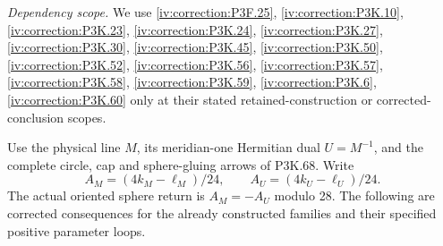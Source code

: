 \begin{theorem}\hypertarget{tag-02VG}{}\label{night:P3K.69}

\par\noindent\textit{Dependency scope.} We use \cref{iv:correction:P3F.25}, \cref{iv:correction:P3K.10}, \cref{iv:correction:P3K.23}, \cref{iv:correction:P3K.24}, \cref{iv:correction:P3K.27}, \cref{iv:correction:P3K.30}, \cref{iv:correction:P3K.45}, \cref{iv:correction:P3K.50}, \cref{iv:correction:P3K.52}, \cref{iv:correction:P3K.56}, \cref{iv:correction:P3K.57}, \cref{iv:correction:P3K.58}, \cref{iv:correction:P3K.59}, \cref{iv:correction:P3K.6}, \cref{iv:correction:P3K.60} only at their stated retained-construction or corrected-conclusion scopes.


Use the physical line \(M\), its meridian-one Hermitian dual
\(U=M^{-1}\), and the complete circle, cap and sphere-gluing arrows
of P3K.68. Write
\[
 A_M=(4k_M-\ell_M)/24,\qquad A_U=(4k_U-\ell_U)/24.
\]
The actual oriented sphere return is \(A_M=-A_U\) modulo 28.
The following are corrected consequences for the already constructed
families and their specified positive parameter loops.


\end{theorem}

